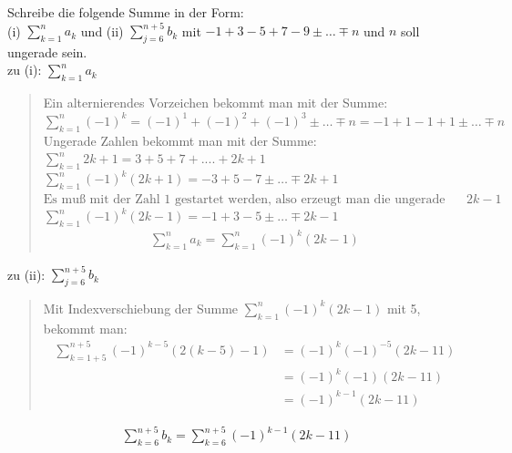 Schreibe die folgende Summe in der Form:\\
(i) \;\;$ \sum\limits_{k=1}^{n}a_k $ und
(ii) $ \sum\limits_{j=6}^{n+5}b_k $
mit $ -1+3-5+7-9\pm\ldots\mp n $ und $n$ soll ungerade sein.\vspace*{6mm}\\
zu (i): $\sum\limits_{k=1}^{n}a_k  $\\
\begin{quote}
	Ein alternierendes Vorzeichen bekommt man mit der Summe:\\
	$\sum\limits_{k=1}^{n}(-1)^k=(-1)^1+(-1)^2+(-1)^3\pm\ldots\mp n=-1+1-1+1\pm\ldots\mp n$\vspace*{2mm}\\
	Ungerade Zahlen bekommt man mit der Summe:\\
	$\sum\limits_{k=1}^{n}2k+1=3+5+7+....+2k+1 $\\
	$\sum\limits_{k=1}^{n}(-1)^k (2k+1)=-3+5-7\pm\ldots\mp 2k+1$\\
	$\text{Es muß mit der Zahl 1 gestartet werden, also erzeugt man die ungerade Zahl mit }2k-1$\\
	$\sum\limits_{k=1}^{n}(-1)^k (2k-1)=-1+3-5\pm\ldots\mp 2k-1$\\
	\begin{align*}
		\sum\limits_{k=1}^{n}a_k=\sum\limits_{k=1}^{n}(-1)^k (2k-1)
	\end{align*}
\end{quote}
\newpage
\noindent
zu (ii): $ \sum\limits_{j=6}^{n+5}b_k $\\
\begin{quote}
	Mit Indexverschiebung der Summe $\sum\limits_{k=1}^{n}(-1)^k (2k-1)  $ mit 5, bekommt man:\\
	\begin{align*}
		\sum\limits_{k=1+5}^{n+5}(-1)^{k-5} (2(k-5)-1)&=(-1)^k(-1)^{-5}(2k-11)\\&=(-1)^k(-1)(2k-11)\\&=(-1)^{k-1}(2k-11)
	\end{align*}
	
\end{quote}
\begin{align*}
	\sum\limits_{k=6}^{n+5}b_k=\sum\limits_{k=6}^{n+5}(-1)^{k-1}(2k-11)
\end{align*}


